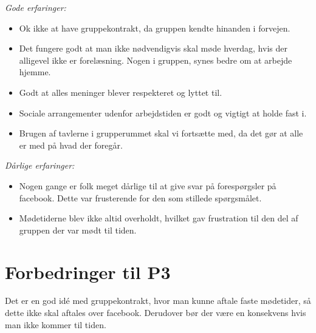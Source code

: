 \emph{Gode erfaringer:}
\begin{itemize}

\item	Ok ikke at have gruppekontrakt, da gruppen kendte hinanden i forvejen.

\item	Det fungere godt at man ikke nødvendigvis skal møde hverdag, hvis der alligevel ikke er forelæsning. Nogen i gruppen, synes bedre om at arbejde hjemme.  

\item	Godt at alles meninger blever respekteret og lyttet til.

\item	Sociale arrangementer udenfor arbejdstiden er godt og vigtigt at holde fast i.

\item	 Brugen af tavlerne i grupperummet skal vi fortsætte med, da det gør at alle er med på hvad der foregår. 
\end{itemize}\emph{Dårlige erfaringer:}
\begin{itemize}

\item	 Nogen gange er folk meget dårlige til at give svar på forespørgsler på facebook. Dette var frusterende for den som stillede spørgsmålet.

\item	Mødetiderne blev ikke altid overholdt, hvilket gav frustration til den del af gruppen der var mødt til tiden.
\end{itemize}

\section{Forbedringer til P3}
Det er en god idé med gruppekontrakt, hvor man kunne aftale faste mødetider, så dette ikke skal aftales over facebook. Derudover bør der være en konsekvens hvis man ikke kommer til tiden.
